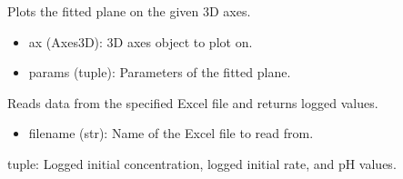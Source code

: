 \documentclass[a4paper,10pt,english]{sphinxmanual}
\begin{document}
\begin{fulllineitems}
\begin{fulllineitems}
\label{\detokenize{utils:src.utils.plane3D_plot.Plane3DPlotter.plot_fitted_plane}}
\pysigstartsignatures
{}
\pysigstopsignatures
\sphinxAtStartPar
Plots the fitted plane on the given 3D axes.
\begin{description}
\begin{itemize}
\item {} 
\sphinxAtStartPar
ax (Axes3D): 3D axes object to plot on.

\item {} 
\sphinxAtStartPar
params (tuple): Parameters of the fitted plane.

\end{itemize}

\end{description}

\end{fulllineitems}


\begin{fulllineitems}
\label{\detokenize{utils:src.utils.plane3D_plot.Plane3DPlotter.read_data}}
\pysigstartsignatures
{}
\pysigstopsignatures
\sphinxAtStartPar
Reads data from the specified Excel file and returns logged values.
\begin{description}
\begin{itemize}
\item {} 
\sphinxAtStartPar
filename (str): Name of the Excel file to read from.

\end{itemize}

\sphinxAtStartPar
tuple: Logged initial concentration, logged initial rate, and pH values.

\end{description}

\end{fulllineitems}


\end{fulllineitems}
\end{document}

